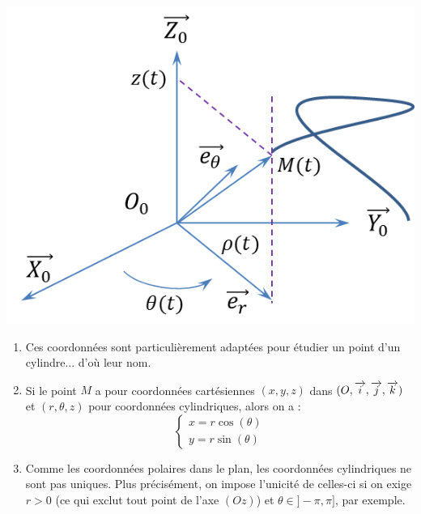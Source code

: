 \documentclass[10pt,oneside]{article}
\begin{document}
\begin{exemple}
\begin{center}
\includegraphics[width=.35\textwidth]{png/coord_cylindriques}
\end{center}
\end{exemple}

\begin{rem}
\begin{enumerate}
\item Ces coordonnées sont particulièrement adaptées pour étudier un point d'un cylindre... d'où leur nom.
\item Si le point $M$ a pour coordonnées cartésiennes $(x,y,z)$ dans $(O, \overrightarrow{i}, \overrightarrow{j}, \overrightarrow{k})$ et $(r,\theta,z)$ pour coordonnées cylindriques, alors on a :
$$\left\{
\begin{array}{l}
x=r\cos(\theta)\\
y=r\sin(\theta)
\end{array}
\right.$$
\item Comme les coordonnées polaires dans le plan, les coordonnées cylindriques ne sont pas uniques. Plus précisément, on impose l'unicité de celles-ci si on exige $r>0$ (ce qui exclut tout point de l'axe $(Oz)$) et $\theta \in ]-\pi,\pi]$, par exemple.\\
\end{enumerate}
\end{rem}
\end{document}

